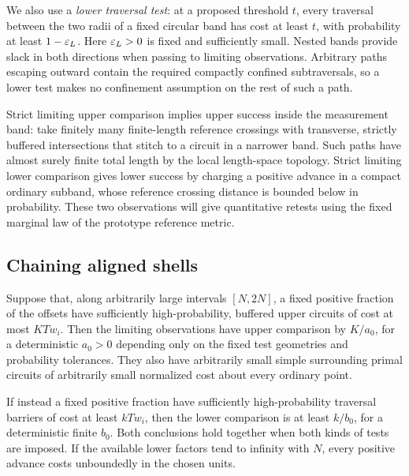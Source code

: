 We also use a \emph{lower traversal test}: at a proposed threshold $t$, every
traversal between the two radii of a fixed circular band has cost at least
$t$, with probability at least $1-\varepsilon_L$. Here $\varepsilon_L>0$ is fixed and
sufficiently small. Nested bands provide slack in both directions when
passing to limiting observations. Arbitrary paths escaping outward contain
the required compactly confined subtraversals, so a lower test makes no
confinement assumption on the rest of such a path.

Strict limiting upper comparison implies upper success inside the
measurement band: take finitely many finite-length reference crossings with
transverse, strictly buffered intersections that stitch to a circuit in a
narrower band. Such paths have almost surely finite total length by the local
length-space topology. Strict limiting lower comparison gives lower success
by charging a positive advance in a compact ordinary subband, whose reference
crossing distance is bounded below in probability. These two observations
will give quantitative retests using the fixed marginal law of the prototype
reference metric.

\subsection{Chaining aligned shells}

\begin{lemma}\label{metric:chain-rule}
Suppose that, along arbitrarily large intervals $[N,2N]$, a fixed positive
fraction of the offsets have sufficiently high-probability, buffered upper
circuits of cost at most $KTw_i$. Then the limiting observations have upper
comparison by $K/a_0$, for a deterministic $a_0>0$ depending only on the fixed
test geometries and probability tolerances. They also have arbitrarily small
simple surrounding primal circuits of arbitrarily small normalized cost
about every ordinary point.

If instead a fixed positive fraction have sufficiently high-probability
traversal barriers of cost at least $kTw_i$, then the lower comparison is at
least $k/b_0$, for a deterministic finite $b_0$. Both conclusions hold
together when both kinds of tests are imposed. If the available lower
factors tend to infinity with $N$, every positive advance costs unboundedly
in the chosen units.
\end{lemma}

